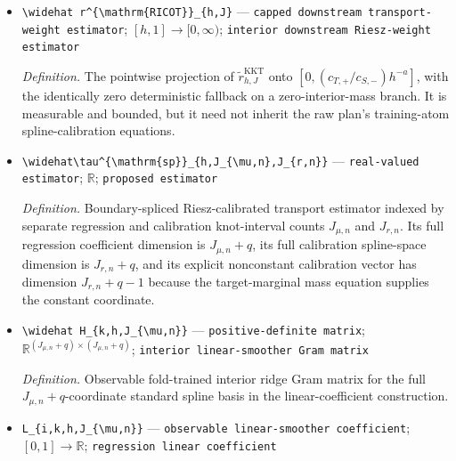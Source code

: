 \documentclass{article}
\begin{document}
\begin{itemize}
  \item \texttt{\textbackslash{}\allowbreak{}widehat r\textasciicircum{}\{\textbackslash{}\allowbreak{}mathrm\{RICOT\}\allowbreak{}\}\allowbreak{}\_\allowbreak{}\{h,\allowbreak{}J\}\allowbreak{}} --- \texttt{capped downstream transport-\allowbreak{}weight estimator}; \([h,1]\to[0,\infty)\); \texttt{interior downstream Riesz-\allowbreak{}weight estimator}
  \par\smallskip\noindent\emph{Definition.} The pointwise projection of \(\widetilde r^{\mathrm{KKT}}_{h,J}\) onto \([0,(c_{T,+}/c_{S,-})h^{-a}]\), with the identically zero deterministic fallback on a zero-interior-mass branch. It is measurable and bounded, but it need not inherit the raw plan's training-atom spline-calibration equations.
  \item \texttt{\textbackslash{}\allowbreak{}widehat\textbackslash{}\allowbreak{}tau\textasciicircum{}\{\textbackslash{}\allowbreak{}mathrm\{sp\}\allowbreak{}\}\allowbreak{}\_\allowbreak{}\{h,\allowbreak{}J\_\allowbreak{}\{\textbackslash{}\allowbreak{}mu,\allowbreak{}n\}\allowbreak{},\allowbreak{}J\_\allowbreak{}\{r,\allowbreak{}n\}\allowbreak{}\}\allowbreak{}} --- \texttt{real-\allowbreak{}valued estimator}; \(\mathbb R\); \texttt{proposed estimator}
  \par\smallskip\noindent\emph{Definition.} Boundary-spliced Riesz-calibrated transport estimator indexed by separate regression and calibration knot-interval counts \(J_{\mu,n}\) and \(J_{r,n}\). Its full regression coefficient dimension is \(J_{\mu,n}+q\), its full calibration spline-space dimension is \(J_{r,n}+q\), and its explicit nonconstant calibration vector has dimension \(J_{r,n}+q-1\) because the target-marginal mass equation supplies the constant coordinate.
  \item \texttt{\textbackslash{}\allowbreak{}widehat H\_\allowbreak{}\{k,\allowbreak{}h,\allowbreak{}J\_\allowbreak{}\{\textbackslash{}\allowbreak{}mu,\allowbreak{}n\}\allowbreak{}\}\allowbreak{}} --- \texttt{positive-\allowbreak{}definite matrix}; \(\mathbb R^{(J_{\mu,n}+q)\times(J_{\mu,n}+q)}\); \texttt{interior linear-\allowbreak{}smoother Gram matrix}
  \par\smallskip\noindent\emph{Definition.} Observable fold-trained interior ridge Gram matrix for the full \(J_{\mu,n}+q\)-coordinate standard spline basis in the linear-coefficient construction.
  \item \texttt{L\_\allowbreak{}\{i,\allowbreak{}k,\allowbreak{}h,\allowbreak{}J\_\allowbreak{}\{\textbackslash{}\allowbreak{}mu,\allowbreak{}n\}\allowbreak{}\}\allowbreak{}} --- \texttt{observable linear-\allowbreak{}smoother coefficient}; \([0,1]\to\mathbb R\); \texttt{regression linear coefficient}

\end{itemize}
\end{document}
